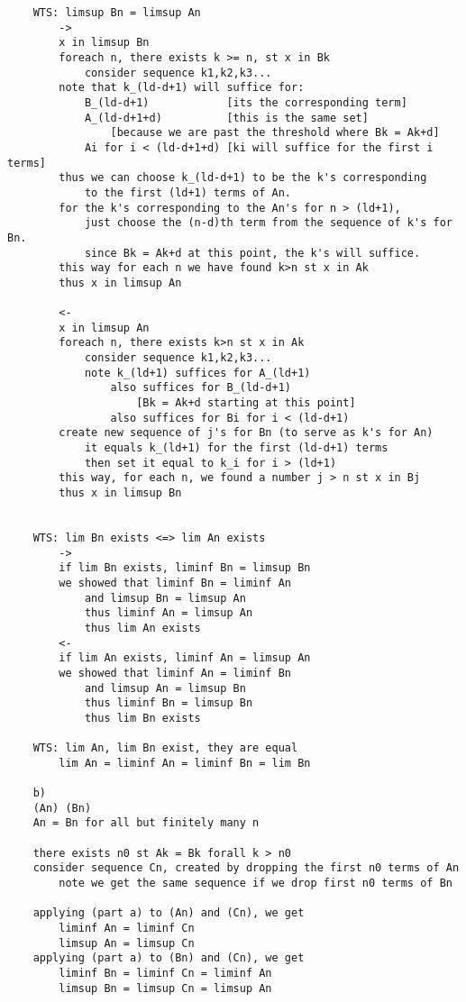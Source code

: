 \documentclass{article}
\begin{document}
\begin{flushleft}
\begin{verbatim}
    WTS: limsup Bn = limsup An 
        -> 
        x in limsup Bn 
        foreach n, there exists k >= n, st x in Bk
            consider sequence k1,k2,k3... 
        note that k_(ld-d+1) will suffice for:
            B_(ld-d+1)            [its the corresponding term]
            A_(ld-d+1+d)          [this is the same set]
                [because we are past the threshold where Bk = Ak+d]
            Ai for i < (ld-d+1+d) [ki will suffice for the first i terms]
        thus we can choose k_(ld-d+1) to be the k's corresponding  
            to the first (ld+1) terms of An. 
        for the k's corresponding to the An's for n > (ld+1),
            just choose the (n-d)th term from the sequence of k's for Bn.
            since Bk = Ak+d at this point, the k's will suffice. 
        this way for each n we have found k>n st x in Ak
        thus x in limsup An 
        
        <- 
        x in limsup An 
        foreach n, there exists k>n st x in Ak 
            consider sequence k1,k2,k3... 
            note k_(ld+1) suffices for A_(ld+1)
                also suffices for B_(ld-d+1)    
                    [Bk = Ak+d starting at this point]
                also suffices for Bi for i < (ld-d+1)
        create new sequence of j's for Bn (to serve as k's for An) 
            it equals k_(ld+1) for the first (ld-d+1) terms 
            then set it equal to k_i for i > (ld+1)
        this way, for each n, we found a number j > n st x in Bj 
        thus x in limsup Bn 


    WTS: lim Bn exists <=> lim An exists 
        -> 
        if lim Bn exists, liminf Bn = limsup Bn 
        we showed that liminf Bn = liminf An 
            and limsup Bn = limsup An 
            thus liminf An = limsup An 
            thus lim An exists 
        <- 
        if lim An exists, liminf An = limsup An 
        we showed that liminf An = liminf Bn 
            and limsup An = limsup Bn 
            thus liminf Bn = limsup Bn 
            thus lim Bn exists 

    WTS: lim An, lim Bn exist, they are equal 
        lim An = liminf An = liminf Bn = lim Bn 

    b)
    (An) (Bn)
    An = Bn for all but finitely many n 

    there exists n0 st Ak = Bk forall k > n0 
    consider sequence Cn, created by dropping the first n0 terms of An 
        note we get the same sequence if we drop first n0 terms of Bn

    applying (part a) to (An) and (Cn), we get
        liminf An = liminf Cn
        limsup An = limsup Cn 
    applying (part a) to (Bn) and (Cn), we get 
        liminf Bn = liminf Cn = liminf An 
        limsup Bn = limsup Cn = limsup An 


\end{verbatim}
\end{flushleft}
\end{document}
